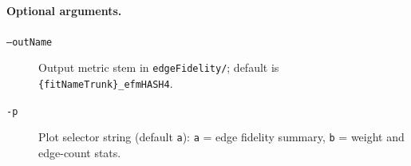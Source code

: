 \documentclass[11pt]{article}
\begin{document}
\paragraph{Optional arguments.}
\begin{description}
    \item[\texttt{--outName}] Output metric stem in \texttt{edgeFidelity/}; default is \texttt{\{fitNameTrunk\}\_efmHASH4}.
    \item[\texttt{-p}] Plot selector string (default \texttt{a}): \texttt{a} = edge fidelity summary, \texttt{b} = weight and edge-count stats.
\end{description}
\end{document}
